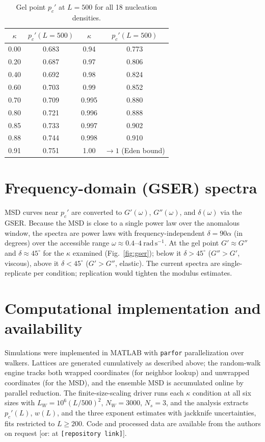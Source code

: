 \documentclass[aps,prl,onecolumn,superscriptaddress,nofootinbib,longbibliography]{revtex4-2}
\newcommand{\pcp}{p_c'}
\newcommand{\kap}{\kappa}
\begin{document}
\begin{table}[h]
\centering
\caption{Gel point $\pcp$ at $L=500$ for all 18 nucleation densities.}
\label{tab:kappa}
\begin{tabular}{cc@{\hspace{2em}}cc}
\toprule
$\kap$ & $\pcp(L{=}500)$ & $\kap$ & $\pcp(L{=}500)$ \\
\midrule
0.00 & 0.683 & 0.94  & 0.773 \\
0.20 & 0.687 & 0.97  & 0.806 \\
0.40 & 0.692 & 0.98  & 0.824 \\
0.60 & 0.703 & 0.99  & 0.852 \\
0.70 & 0.709 & 0.995 & 0.880 \\
0.80 & 0.721 & 0.996 & 0.888 \\
0.85 & 0.733 & 0.997 & 0.902 \\
0.88 & 0.744 & 0.998 & 0.910 \\
0.91 & 0.751 & 1.00  & $\to1$ (Eden bound) \\
\bottomrule
\end{tabular}
\end{table}

\section{Frequency-domain (GSER) spectra}
MSD curves near $\pcp$ are converted to $G'(\omega)$, $G''(\omega)$, and $\delta(\omega)$ via the
GSER. Because the MSD is close to a single power law over the anomalous window, the spectra are
power laws with frequency-independent $\delta=90\alpha$ (in degrees) over the accessible range
$\omega\approx0.4$--$4~\mathrm{rad\,s^{-1}}$. At the gel point $G'\approx G''$ and
$\delta\approx45^{\circ}$ for the $\kap$ examined (Fig.~\ref{fig:gser}); below it $\delta>45^{\circ}$
($G''>G'$, viscous), above it $\delta<45^{\circ}$ ($G'>G''$, elastic). The current spectra are
single-replicate per condition; replication would tighten the modulus estimates.

\section{Computational implementation and availability}
Simulations were implemented in MATLAB with \texttt{parfor} parallelization over walkers.
Lattices are generated cumulatively as described above; the random-walk engine tracks both wrapped
coordinates (for neighbor lookup) and unwrapped coordinates (for the MSD), and the ensemble MSD
is accumulated online by parallel reduction. The finite-size-scaling driver runs each $\kap$
condition at all six sizes with $L_W=10^6(L/500)^2$, $N_W=3000$, $N_s=3$, and the analysis
extracts $\pcp(L)$, $w(L)$, and the three exponent estimates with jackknife uncertainties, fits
restricted to $L\ge200$. Code and processed data are available from the authors on request
[or: at \texttt{[repository link]}].
\end{document}
